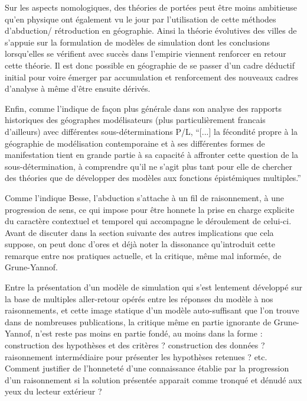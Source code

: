 Sur les aspects nomologiques, des théories de portées peut être moins ambitieuse qu'en physique ont également vu le jour par l'utilisation de cette méthodes d'abduction/ rétroduction en géographie. Ainsi la théorie évolutives des villes de \textcite{Pumain1997} s'appuie sur la formulation de modèles de simulation dont les conclusions lorsqu'elles se vérifient avec succès dans l'empirie viennent renforcer en retour cette théorie. Il est donc possible en géographie de se passer d'un cadre déductif initial pour voire émerger par accumulation et renforcement des nouveaux cadres d'analyse à même d'être ensuite dérivés. 

Enfin, comme l'indique de façon plus générale \textcite{Varenne2014} dans son analyse des rapports historiques des géographes modélisateurs (plus particulièrement francais d'ailleurs) avec différentes sous-déterminations P/L, \enquote{[...] la fécondité propre à la géographie de modélisation contemporaine et à ses différentes formes de manifestation tient en grande partie à sa capacité à affronter cette question de la sous-détermination, à comprendre qu’il ne s’agit plus tant pour elle de chercher des théories que de développer des modèles aux fonctions épistémiques multiples.}


Comme l'indique Besse, l'abduction s'attache à un fil de raisonnement, à une progression de sens, ce qui impose pour être honnete la prise en charge explicite du caractère contextuel et temporel qui accompagne le déroulement de celui-ci. Avant de discuter dans la section suivante des autres implications que cela suppose, on peut donc d'ores et déjà noter la dissonance qu'introduit cette remarque entre nos pratiques actuelle, et la critique, même mal informée, de Grune-Yannof. 

Entre la présentation d'un modèle de simulation qui s'est lentement développé sur la base de multiples aller-retour opérés entre les réponses du modèle à nos raisonnements, et cette image statique d'un modèle auto-suffisant que l'on trouve dans de nombreuses publications, la critique même en partie ignorante de Grune-Yannof, n'est reste pas moins en partie fondé, au moins dans la forme : construction des hypothèses et des critères ? construction des données ? raisonnement intermédiaire pour présenter les hypothèses retenues ? etc. Comment justifier de l'honneteté d'une connaissance établie par la progression d'un raisonnement si la solution présentée apparait comme tronqué et dénudé aux yeux du lecteur extérieur ? 

